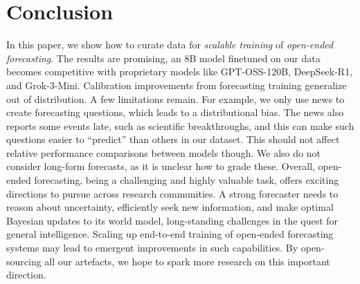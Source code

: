 \section{Conclusion}
\label{sec:conclusion}

 In this paper, we show how to curate data for \textit{scalable training} of \textit{open-ended forecasting}. The results are promising, an 8B model finetuned on our data becomes competitive with proprietary models like GPT-OSS-120B, DeepSeek-R1, and Grok-3-Mini. Calibration improvements from forecasting training generalize out of distribution. A few limitations remain. For example, we only use news to create forecasting questions, which leads to a distributional bias. The news also reports some events late, such as scientific breakthroughs, and this can make such questions easier to ``predict'' than others in our dataset. This should not affect relative performance comparisons between models though. We also do not consider long-form forecasts, as it is unclear how to grade these. Overall, open-ended forecasting, being a challenging and highly valuable task, offers exciting directions to pursue across research communities. A strong forecaster needs to reason about uncertainty, efficiently seek new information, and make optimal Bayesian updates to its world model, long-standing challenges in the quest for general intelligence. Scaling up end-to-end training of open-ended forecasting systems may lead to emergent improvements in such capabilities. By open-sourcing all our artefacts, we hope to spark more research on this important direction.
